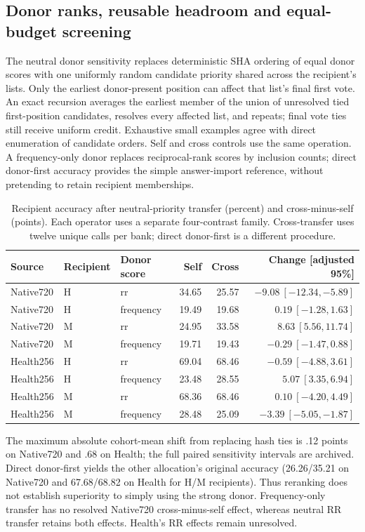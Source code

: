 \subsection{Donor ranks, reusable headroom and equal-budget screening}
\label{app:budget_donor}
The neutral donor sensitivity replaces deterministic SHA ordering of equal donor scores with one uniformly random candidate priority shared across the recipient's lists. Only the earliest donor-present position can affect that list's final first vote. An exact recursion averages the earliest member of the union of unresolved tied first-position candidates, resolves every affected list, and repeats; final vote ties still receive uniform credit. Exhaustive small examples agree with direct enumeration of candidate orders. Self and cross controls use the same operation. A frequency-only donor replaces reciprocal-rank scores by inclusion counts; direct donor-first accuracy provides the simple answer-import reference, without pretending to retain recipient memberships.

\begin{table}[ht]
\centering\small
\caption{Recipient accuracy after neutral-priority transfer (percent) and cross-minus-self (points). Each operator uses a separate four-contrast family. Cross-transfer uses twelve unique calls per bank; direct donor-first is a different procedure.}
\begin{tabular}{lllrrr}
\toprule
Source & Recipient & Donor score & Self & Cross & Change [adjusted 95\%]\\
\midrule
Native720 & H & rr & 34.65 & 25.57 & $-9.08\ [-12.34,-5.89]$\\
Native720 & H & frequency & 19.49 & 19.68 & $0.19\ [-1.28,1.63]$\\
Native720 & M & rr & 24.95 & 33.58 & $8.63\ [5.56,11.74]$\\
Native720 & M & frequency & 19.71 & 19.43 & $-0.29\ [-1.47,0.88]$\\
Health256 & H & rr & 69.04 & 68.46 & $-0.59\ [-4.88,3.61]$\\
Health256 & H & frequency & 23.48 & 28.55 & $5.07\ [3.35,6.94]$\\
Health256 & M & rr & 68.36 & 68.46 & $0.10\ [-4.20,4.49]$\\
Health256 & M & frequency & 28.48 & 25.09 & $-3.39\ [-5.05,-1.87]$\\
\bottomrule
\end{tabular}
\end{table}

The maximum absolute cohort-mean shift from replacing hash ties is .12 points on Native720 and .68 on Health; the full paired sensitivity intervals are archived. Direct donor-first yields the other allocation's original accuracy (26.26/35.21 on Native720 and 67.68/68.82 on Health for H/M recipients). Thus reranking does not establish superiority to simply using the strong donor. Frequency-only transfer has no resolved Native720 cross-minus-self effect, whereas neutral RR transfer retains both effects. Health's RR effects remain unresolved.

